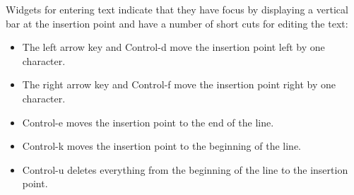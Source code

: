 Widgets for entering text indicate that they have focus by displaying
a vertical bar at the insertion point and have a number of short cuts
for editing the text:

\begin{itemize}
\item The left arrow key and Control-d move the insertion point left by
  one character.

\item The right arrow key and Control-f move the insertion point right
  by one character.

\item Control-e moves the insertion point to the end of the line.

\item Control-k moves the insertion point to the beginning of the line.

\item Control-u deletes everything from the beginning of the line to the
  insertion point.
\end{itemize}

